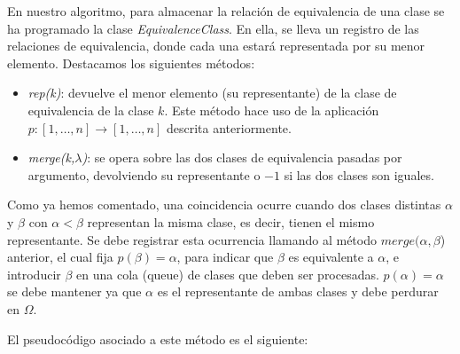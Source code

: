 \iffalse
\begin{definition}
    Dadas $\alpha, \beta \in \Omega$ dos clases, se dice que existe una \textit{coincidencia} cuando para algún $i$ con $i\leq i \leq r+1$, se tiene $w=st$ con $s=x_1x_2\cdots x_{i-1}$ , $t=x_ix_{i+1}\cdots x_r$  y $\alpha:=\gamma^s$ y $\beta:=\gamma^{t-1}$.
\end{definition}
\fi




En nuestro algoritmo, para almacenar la relación de equivalencia de una clase se ha programado la clase \textit{EquivalenceClass}. En ella, se lleva un registro de las relaciones de equivalencia, donde cada una estará representada por su menor elemento. Destacamos los siguientes métodos:
\begin{itemize}
    \item \textit{rep(k)}: devuelve el menor elemento (su representante) de la clase de equivalencia de la clase $k$. Este método hace uso de la aplicación $p: [1,\ldots,n] \to [1,\ldots,n]$ descrita anteriormente.
    \item \textit{merge(k,$\lambda$)}: se opera sobre las dos clases de equivalencia pasadas por argumento, devolviendo su representante o $-1$ si las dos clases son iguales.
\end{itemize}


Como ya hemos comentado, una coincidencia ocurre cuando dos clases distintas $\alpha$ y $\beta$ con $\alpha < \beta$ representan la misma clase, es decir, tienen el mismo representante.
Se debe registrar esta ocurrencia llamando al método $merge(\alpha, \beta$) anterior, el cual fija $p(\beta)=\alpha$, para indicar que $\beta$ es equivalente a $\alpha$, e introducir $\beta$ en una cola (queue) de clases que deben ser procesadas.  $p(\alpha)=\alpha$ se debe  mantener  ya que $\alpha$ es el representante de ambas clases y debe perdurar en $\Omega$. 



El pseudocódigo asociado a este método es el siguiente:






